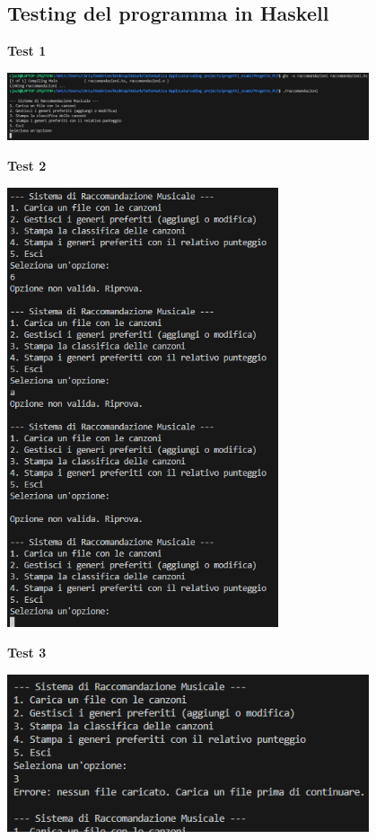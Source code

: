 \documentclass[a4paper,11pt]{article}
\begin{document}
\subsection{Testing del programma in Haskell}
\begin{center}
    \textbf{Test 1}
    \par
    \vspace{0.5cm}
    \includegraphics[width=0.8\textwidth]{htest1}
\end{center}
\begin{center}
    \textbf{Test 2}
    \par
    \vspace{0.5cm}
    \includegraphics[width=0.6\textwidth]{htest2}
\end{center}
\begin{center}
    \textbf{Test 3}
    \par
    \vspace{0.5cm}
    \includegraphics[width=0.8\textwidth]{htest3}
\end{center}
\end{document}
